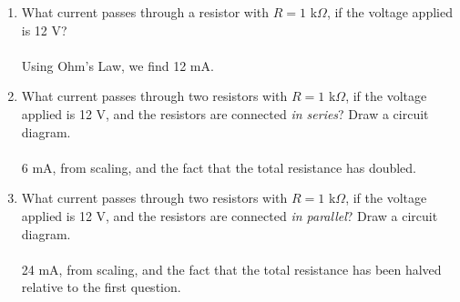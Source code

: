 \documentclass[10pt]{article}
\begin{document}
\begin{enumerate}
\begin{enumerate}
\item What current passes through a resistor with $R=1$ k$\Omega$, if the voltage applied is 12 V? \\ \\
Using Ohm's Law, we find 12 mA.
\\
\item What current passes through two resistors with $R=1$ k$\Omega$, if the voltage applied is 12 V, and the resistors are connected \textit{in series}? Draw a circuit diagram. \\ \\
6 mA, from scaling, and the fact that the total resistance has doubled.
\\
\item What current passes through two resistors with $R=1$ k$\Omega$, if the voltage applied is 12 V, and the resistors are connected \textit{in parallel}? Draw a circuit diagram. \\ \\
24 mA, from scaling, and the fact that the total resistance has been halved relative to the first question.
\end{enumerate}
\end{enumerate}
\end{document}
